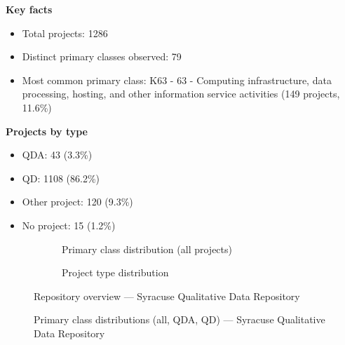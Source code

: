 \textbf{Key facts}

\begin{itemize}
    \item Total projects: 1286
    \item Distinct primary classes observed: 79
    \item Most common primary class: K63 - 63 - Computing infrastructure, data processing, hosting, and other information service activities (149 projects, 11.6\%)
\end{itemize}

\textbf{Projects by type}

\begin{itemize}
    \item QDA: 43 (3.3\%)
    \item QD: 1108 (86.2\%)
    \item Other project: 120 (9.3\%)
    \item No project: 15 (1.2\%)
\end{itemize}

\begin{figure}[H]
    \centering
    \begin{subfigure}[t]{0.49\textwidth}
        \centering
        
        \caption{Primary class distribution (all projects)}
    \end{subfigure}
    \hfill
    \begin{subfigure}[t]{0.49\textwidth}
        \centering
        
        \caption{Project type distribution}
    \end{subfigure}
    \caption{Repository overview --- Syracuse Qualitative Data Repository}
\end{figure}

\clearpage

\begin{figure}[H]
    \centering
    
    \par\vspace{0.8em}
    
    \par\vspace{0.8em}
    
    \caption{Primary class distributions (all, QDA, QD) --- Syracuse Qualitative Data Repository}
\end{figure}

